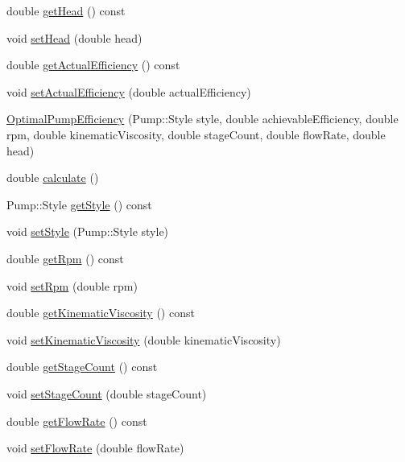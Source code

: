 \begin{DoxyCompactItemize}
\item 
double \hyperlink{class_optimal_pump_efficiency_af31fdb10aabc197ff7536c9bbe006573}{get\+Head} () const
\item 
void \hyperlink{class_optimal_pump_efficiency_ac317c900ec68797cf051977147ea33da}{set\+Head} (double head)
\item 
double \hyperlink{class_optimal_pump_efficiency_aa2ac8a7c61bc28f82e30cb44b9c21008}{get\+Actual\+Efficiency} () const
\item 
void \hyperlink{class_optimal_pump_efficiency_a539b20c53c7ba6a5983a60d74be4ac9e}{set\+Actual\+Efficiency} (double actual\+Efficiency)
\item 
\hyperlink{class_optimal_pump_efficiency_ae07626ea079ff810ac6518d54c52b24a}{Optimal\+Pump\+Efficiency} (Pump\+::\+Style style, double achievable\+Efficiency, double rpm, double kinematic\+Viscosity, double stage\+Count, double flow\+Rate, double head)
\item 
double \hyperlink{class_optimal_pump_efficiency_ac40720d1fcdf40d8b364df37e58e7f4d}{calculate} ()
\item 
Pump\+::\+Style \hyperlink{class_optimal_pump_efficiency_a601fe15e9acc23112743fabe417030fb}{get\+Style} () const
\item 
void \hyperlink{class_optimal_pump_efficiency_ab6b85c8c08d6641c5375c65436f16a2f}{set\+Style} (Pump\+::\+Style style)
\item 
double \hyperlink{class_optimal_pump_efficiency_a58e8a430ced612e0518abd07fb30b085}{get\+Rpm} () const
\item 
void \hyperlink{class_optimal_pump_efficiency_afc6b6f46b4e289efc8819249ad1c9fb5}{set\+Rpm} (double rpm)
\item 
double \hyperlink{class_optimal_pump_efficiency_a8c2f7fcacce2b42ed83f29aec2d4671e}{get\+Kinematic\+Viscosity} () const
\item 
void \hyperlink{class_optimal_pump_efficiency_a00017e0bd100beb2f4b0bf2db5e3687f}{set\+Kinematic\+Viscosity} (double kinematic\+Viscosity)
\item 
double \hyperlink{class_optimal_pump_efficiency_aac0c1a4a6492bf00b245c2a61d100eaa}{get\+Stage\+Count} () const
\item 
void \hyperlink{class_optimal_pump_efficiency_a5b0b2a24a87c1c8fc92aa96c6ba4b727}{set\+Stage\+Count} (double stage\+Count)
\item 
double \hyperlink{class_optimal_pump_efficiency_a77c6618681b0fd3a0fc02dc49d16ee99}{get\+Flow\+Rate} () const
\item 
void \hyperlink{class_optimal_pump_efficiency_a90067b57c559fd3274fb8d6e00f6221d}{set\+Flow\+Rate} (double flow\+Rate)

\end{DoxyCompactItemize}
